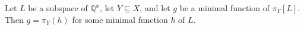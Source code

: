 Let $L$ be a subspace of $\mathbb{Q}^x$, let $Y \subseteq X$, and let $g$ be a minimal function of $\pi_Y[L]$. Then $g = \pi_Y(h)$ for some minimal function $h$ of $L$.
